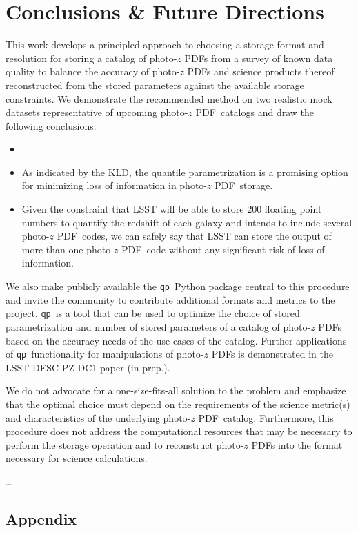 \documentclass[\docopts]{\docclass}
\newcommand{\qp}{\texttt{qp}}
\newcommand{\pz}{photo-$z$ PDF}
\begin{document}
\section{Conclusions \& Future Directions}
\label{sec:conclusions}


This work develops a principled approach to choosing a storage format and
resolution for storing a catalog of \pz s from a survey of known data quality
to balance the accuracy of \pz s and science products thereof reconstructed
from the stored parameters against the available storage constraints.  We
demonstrate the recommended method on two realistic mock datasets
representative of upcoming \pz\ catalogs and draw the following conclusions:
\begin{itemize}
  \item
  \item As indicated by the KLD, the quantile parametrization is a promising
option for minimizing loss of information in \pz\ storage.
  \item Given the constraint that LSST will be able to store 200 floating point
numbers to quantify the redshift of each galaxy and intends to include several
\pz\ codes, we can safely say that LSST can store the output of more than one
\pz\ code without any significant risk of loss of information.
\end{itemize}

We also make publicly available the \qp\ Python package central to this
procedure and invite the community to contribute additional formats and metrics
to the project.  \qp\ is a tool that can be used to optimize the choice of
stored parametrization and number of stored parameters of a catalog of \pz s
based on the accuracy needs of the use cases of the catalog.  Further
applications of \qp\ functionality for manipulations of \pz s is demonstrated
in the LSST-DESC PZ DC1 paper (in prep.).

We do not advocate for a one-size-fits-all solution to the problem and
emphasize that the optimal choice must depend on the requirements of the
science metric(s) and characteristics of the underlying \pz\ catalog.
Furthermore, this procedure does not address the computational resources that
may be necessary to perform the storage operation and to reconstruct \pz s into
the format necessary for science calculations.

\dots


\subsection*{Appendix}
\label{sec:kld}
\end{document}
